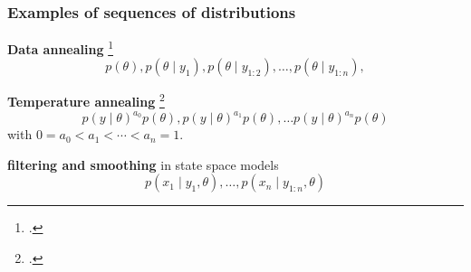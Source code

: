 \documentclass{beamer}
\begin{document}
\begin{frame}[fragile]
\frametitle{Examples of sequences of distributions}

{\bf Data annealing} \footcite{Chopin}
\[
p(\theta), p(\theta \mid y_1), p(\theta \mid y_{1:2}), \ldots, p(\theta \mid y_{1:n}),
\]

{\bf Temperature annealing} \footcite{Neal}
\[
p(y \mid \theta)^{a_0} p(\theta), p(y \mid \theta)^{a_1} p(\theta),  \ldots p(y \mid \theta)^{a_n} p(\theta)
\]
with $0 = a_0 < a_1 < \cdots < a_n = 1$. 
\newline


{\bf filtering and smoothing} in state space models
\[
p(x_1 \mid y_1, \theta), \ldots , p(x_{n} \mid y_{1:n}, \theta)
\]

\end{frame}
\end{document}
